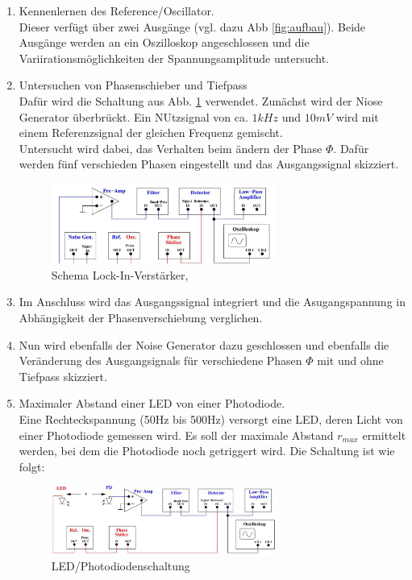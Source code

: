 \begin{enumerate}
\item Kennenlernen des Reference/Oscillator.\\ Dieser verfügt über zwei
Ausgänge (vgl. dazu Abb \ref{fig:aufbau}).
Beide Ausgänge werden an ein Oszilloskop angeschlossen und die Variirationsmöglichkeiten
der Spannungsamplitude untersucht. 
\item Untersuchen von Phasenschieber und Tiefpass\\
Dafür wird die Schaltung aus Abb. \ref{fig:aufbau_schema2} verwendet.
Zunächst wird der Niose Generator überbrückt. Ein NUtzsignal von ca. $1kHz$ und $10mV$
wird mit einem Referenzsignal der gleichen Frequenz gemischt.\\
Untersucht wird dabei, das Verhalten beim ändern der Phase $\Phi$.
Dafür werden fünf verschieden Phasen eingestellt und das Ausgangssignal skizziert.
\begin{figure}[H]
    \centering
    \includegraphics[width=0.7\textwidth]{bilder/aufbau_schema2.jpg}
    \caption{Schema Lock-In-Verstärker,\cite[4]{Anleitung}}
    \label{fig:aufbau_schema2}
\end{figure}
\item Im Anschluss wird das Ausgangssignal integriert und die Asugangspannung
in Abhängigkeit der Phasenverschiebung verglichen.
\item Nun wird ebenfalls der Noise Generator dazu geschlossen und ebenfalls
die Veränderung des Ausgangsignals für verschiedene Phasen $\Phi$ mit und ohne Tiefpass
skizziert.
\item Maximaler Abstand einer LED von einer Photodiode.\\
Eine Rechteckspannung (50Hz bis 500Hz) versorgt eine LED, deren
Licht von einer Photodiode gemessen wird. Es soll der maximale Abstand $r_{max}$
ermittelt werden, bei dem die Photodiode noch getriggert wird.
Die Schaltung ist wie folgt:
\begin{figure}[H]
    \centering
    \includegraphics[width=0.7\textwidth]{bilder/LED.jpg}
    \caption{LED/Photodiodenschaltung \cite[5]{Anleitung}}
    \label{fig:LED}
\end{figure}  
\end{enumerate}